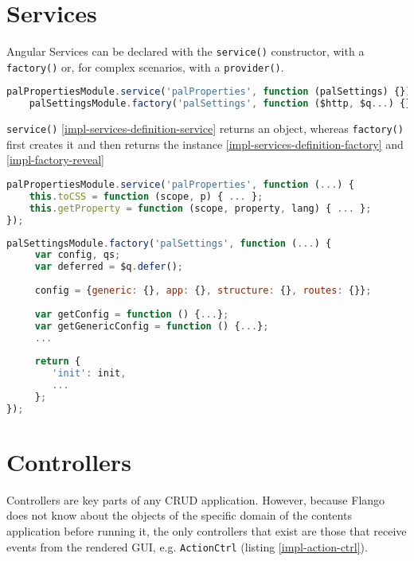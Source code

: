 \section{Services}
Angular Services can be declared with the \texttt{service()} constructor, with a \texttt{factory()} or, for complex scenarios, with a \texttt{provider()}.

\begin{lstlisting}[language=JavaScript,caption=Examples of services definition, label=impl-services-definition]
    palPropertiesModule.service('palProperties', function (palSettings) {});
    palSettingsModule.factory('palSettings', function ($http, $q...) {});
\end{lstlisting}




\texttt{service()} \ref{impl-services-definition-service} returns an object, whereas \texttt{factory()} first creates it and then returns the instance \ref{impl-services-definition-factory} and \ref{impl-factory-reveal}

\begin{lstlisting}[language=JavaScript,caption=Examples of services definition (service()), label=impl-services-definition-service]
palPropertiesModule.service('palProperties', function (...) {
    this.toCSS = function (scope, p) { ... };
    this.getProperty = function (scope, property, lang) { ... };
});
\end{lstlisting}

\begin{lstlisting}[language=JavaScript,caption=Examples of services definition (factory()), label=impl-services-definition-factory]
palSettingsModule.factory('palSettings', function (...) {
     var config, qs;
     var deferred = $q.defer();
     
     config = {generic: {}, app: {}, structure: {}, routes: {}};
     
     var getConfig = function () {...};
     var getGenericConfig = function () {...};
     ...
     
     return {
        'init': init,
        ...
     };
});
\end{lstlisting}

\section{Controllers}
Controllers are key parts of any \ac{CRUD} application.
However, because Flango \cm does not know about the objects of the specific domain  of the contents application before running it, the only controllers that exist are those that receive events from the rendered \ac{GUI}, e.g. \texttt{ActionCtrl} (listing \ref{impl-action-ctrl}).
